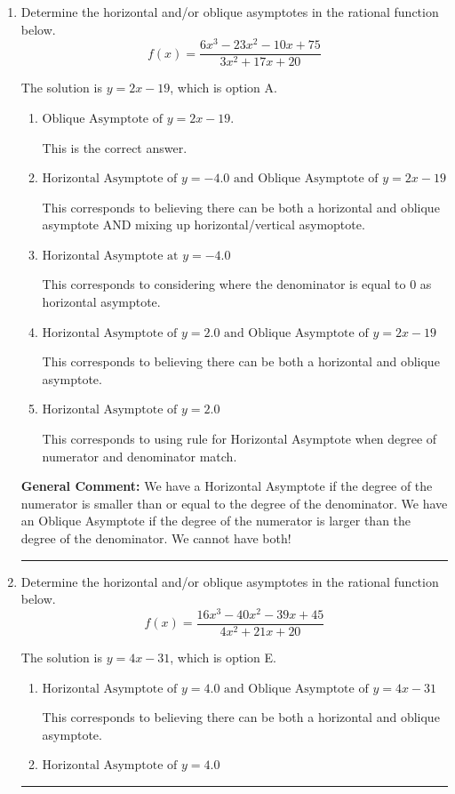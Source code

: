 \documentclass{extbook}[14pt]
\newcommand{\litem}[1]{\item #1

\rule{\textwidth}{0.4pt}}
\begin{document}
\begin{enumerate}\litem{
Determine the horizontal and/or oblique asymptotes in the rational function below.
\[ f(x) = \frac{6x^{3} -23 x^{2} -10 x + 75}{3x^{2} +17 x + 20} \]

The solution is \( y = 2x -19 \), which is option A.\begin{enumerate}[label=\Alph*.]
\item \( \text{Oblique Asymptote of } y = 2x -19. \)

This is the correct answer.
\item \( \text{Horizontal Asymptote of } y = -4.0 \text{ and Oblique Asymptote of } y = 2x -19 \)

This corresponds to believing there can be both a horizontal and oblique asymptote AND mixing up horizontal/vertical asymoptote.
\item \( \text{Horizontal Asymptote at } y = -4.0 \)

This corresponds to considering where the denominator is equal to 0 as horizontal asymptote.
\item \( \text{Horizontal Asymptote of } y = 2.0 \text{ and Oblique Asymptote of } y = 2x -19 \)

This corresponds to believing there can be both a horizontal and oblique asymptote.
\item \( \text{Horizontal Asymptote of } y = 2.0  \)

This corresponds to using rule for Horizontal Asymptote when degree of numerator and denominator match.
\end{enumerate}

\textbf{General Comment:} We have a Horizontal Asymptote if the degree of the numerator is smaller than or equal to the degree of the denominator. We have an Oblique Asymptote if the degree of the numerator is larger than the degree of the denominator. We cannot have both!
}
\litem{
Determine the horizontal and/or oblique asymptotes in the rational function below.
\[ f(x) = \frac{16x^{3} -40 x^{2} -39 x + 45}{4x^{2} +21 x + 20} \]

The solution is \( y = 4x -31 \), which is option E.\begin{enumerate}[label=\Alph*.]
\item \( \text{Horizontal Asymptote of } y = 4.0 \text{ and Oblique Asymptote of } y = 4x -31 \)

This corresponds to believing there can be both a horizontal and oblique asymptote.
\item \( \text{Horizontal Asymptote of } y = 4.0  \)


\end{enumerate}}
\end{enumerate}
\end{document}
